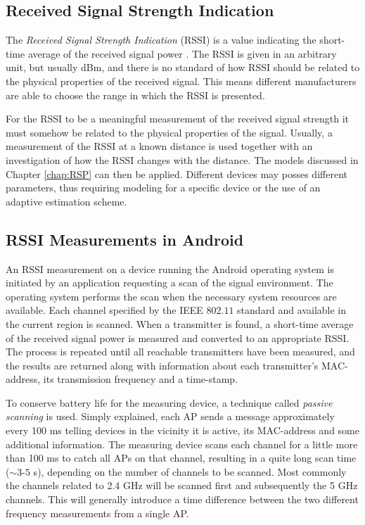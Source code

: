 \documentclass{LTHthesis}
\begin{document}
\subsection{Received Signal Strength Indication}
%
The \emph{Received Signal Strength Indication} (RSSI) is a value indicating the short-time average of the received signal power \cite{fig_fra10}. The RSSI is given in an arbitrary unit, but usually dBm, and there is no standard of how RSSI should be related to the physical properties of the received signal. This means different manufacturers are able to choose the range in which the RSSI is presented. 

For the RSSI to be a meaningful measurement of the received signal strength it must somehow be related to the physical properties of the signal. Usually, a measurement of the RSSI at a known distance is used together with an investigation of how the RSSI changes with the distance. The models discussed in Chapter \ref{chap:RSP} can then be applied. Different devices may posses different parameters, thus requiring modeling for a specific device or the use of an adaptive estimation scheme. 
%

\subsection{RSSI Measurements in Android}

An RSSI measurement on a device running the Android operating system is initiated by an application requesting a scan of the signal environment. The operating system performs the scan when the necessary system resources are available. Each channel specified by the IEEE $802.11$ standard and available in the current region is scanned. When a transmitter is found, a short-time average of the received signal power is measured and converted to an appropriate RSSI. The process is repeated until all reachable transmitters have been measured, and the results are returned along with information about each transmitter's MAC-address, its transmission frequency and a time-stamp. 

To conserve battery life for the measuring device, a technique called \emph{passive scanning} is used. Simply explained, each AP sends a message approximately every 100 ms telling devices in the vicinity it is active, its MAC-address and some additional information. The measuring device scans each channel for a little more than 100 ms to catch all APs on that channel, resulting in a quite long scan time ($\sim 3$-$5$ s), depending on the number of channels to be scanned. Most commonly the channels related to 2.4 GHz will be scanned first and subsequently the 5 GHz channels. This will generally introduce a time difference between the two different frequency measurements from a single AP.
\end{document}
